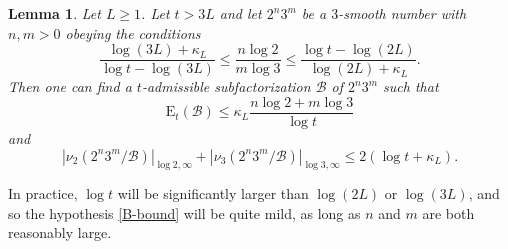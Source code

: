 \documentclass[12pt,a4paper,reqno]{amsart}
\numberwithin{equation}{section}
\theoremstyle{plain}
\newtheorem{lemma}[theorem]{Lemma}
\theoremstyle{definition}
\newcommand\tuple{{\mathcal B}}
\newcommand\excess{{\mathrm{E}}}
\begin{document}
\begin{lemma}\label{bound23}  Let $L \geq 1$.  Let $t > 3L$ and let $2^n 3^m$ be a $3$-smooth number with $n,m > 0$ obeying the conditions
  \begin{equation}\label{B-bound}
  \frac{\log(3L)+\kappa_L}{\log t - \log(3L)} \leq \frac{n \log 2}{m \log 3} \leq \frac{\log t - \log(2L)}{\log(2L)+\kappa_L}.
  \end{equation}
  Then one can find a $t$-admissible subfactorization $\tuple$ of $2^n 3^m$ such that
  \begin{equation}\label{excess-bound} 
    \excess_t(\tuple) \leq \kappa_L \frac{n \log 2 + m \log 3}{\log t} 
  \end{equation}
  and
  \begin{equation}\label{surplus-bound} 
    |\nu_2(2^n 3^m/\tuple)|_{\log 2,\infty} + |\nu_3(2^n 3^m/\tuple)|_{\log 3,\infty}  \leq 2(\log t + \kappa_L).
  \end{equation}
  \end{lemma}
  
  In practice, $\log t$ will be significantly larger than $\log(2L)$ or $\log(3L)$, and so the hypothesis \eqref{B-bound} will be quite mild, as long as $n$ and $m$ are both reasonably large.
  
\end{document}
